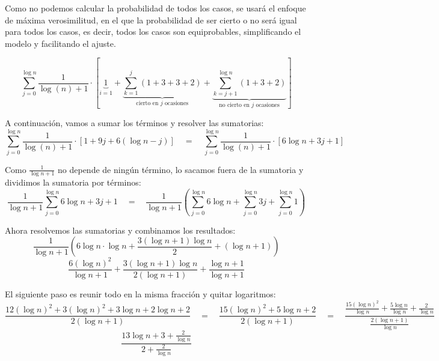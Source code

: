 \documentclass[10pt,a4paper,spanish]{report}
\theoremstyle{definition}
\theoremstyle{remark}
\begin{document}
Como no podemos calcular la probabilidad de todos los casos, se usará el enfoque de máxima verosimilitud, en el que la probabilidad de ser cierto o no será igual para todos los casos, es decir, todos los casos son equiprobables, simplificando el modelo y facilitando el ajuste.
\begin{center}
\begin{displaymath}
  \sum_{j=0}^{\log n} \frac{1}{\log(n) + 1} \cdot \left [ \underbrace{1}_{i=1} + \underbrace{\sum_{k = 1}^{j}(1 + 3 + 3 + 2)}_{\text{cierto en }j\text{ ocasiones}} + \underbrace{\sum_{k = j + 1}^{\log n}(1 + 3 + 2)}_{\text{no cierto en }j\text{ ocasiones}} \right]
\end{displaymath}

A continuación, vamos a sumar los términos y resolver las sumatorias:
\begin{displaymath}
  \sum_{j=0}^{\log n} \frac{1}{\log(n) + 1}\cdot\left[ 1 + 9j + 6(\log n - j) \right] \quad = \quad \sum_{j=0}^{\log n} \frac{1}{\log(n) + 1}\cdot\left[ 6\log n + 3j + 1 \right]
\end{displaymath}

Como $\frac{1}{\log n + 1}$ no depende de ningún término, lo sacamos fuera de la sumatoria y dividimos la sumatoria por términos:
\begin{displaymath}
  \frac{1}{\log n + 1} \sum_{j = 0}^{\log n} 6\log n + 3j + 1 \quad = \quad \frac{1}{\log n + 1} \left(\sum_{j = 0}^{\log n} 6\log n + \sum_{j = 0}^{\log n} 3j + \sum_{j = 0}^{\log n} 1 \right)
\end{displaymath}

Ahora resolvemos las sumatorias y combinamos los resultados:
\begin{displaymath}
  \frac{1}{\log n + 1} \left(6\log n \cdot \log n + \frac{3(\log n + 1)\log n}{2} + (\log n + 1) \right)
\end{displaymath}
\begin{displaymath}
  \frac{6(\log n)^2}{\log n + 1} + \frac{3(\log n + 1)\log n}{2(\log n + 1)} + \frac{\log n + 1}{\log n + 1}
\end{displaymath}

El siguiente paso es reunir todo en la misma fracción y quitar logaritmos:
\begin{displaymath}
  \frac{12(\log n)^2 + 3(\log n)^2 + 3\log n + 2\log n + 2}{2(\log n + 1)} \quad = \quad \frac{15(\log n)^2 + 5\log n + 2}{2(\log n + 1)} \quad = \quad 
  \frac{\frac{15(\log n)^2}{\log n} + \frac{5\log n}{\log n} + \frac{2}{\log n}}{\frac{2(\log n + 1)}{\log n}}
\end{displaymath}
\begin{displaymath}
  \frac{13\log n + 3 + \frac{2}{\log n}}{2 + \frac{2}{\log n}}
\end{displaymath}


\end{center}
\end{document}
